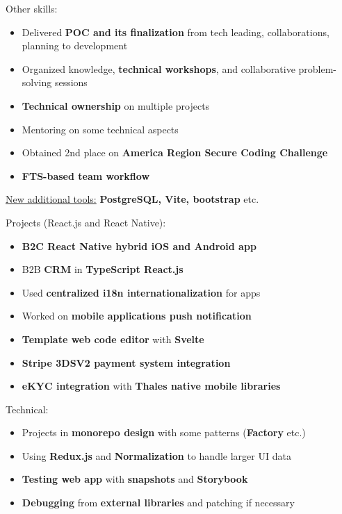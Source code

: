 \documentclass[10pt,a4paper,ragged2e,withhyper]{altacv}
\begin{document}
\medskip
Other skills:
\begin{itemize}
  \item Delivered \textbf{POC and its finalization} from tech leading, collaborations, planning to development
  \item Organized knowledge, \textbf{technical workshops}, and collaborative problem-solving sessions
  \item \textbf{Technical ownership} on multiple projects
  \item Mentoring on some technical aspects
  \item Obtained 2nd place on \textbf{America Region Secure Coding Challenge}
  \item \textbf{FTS-based team workflow}
\end{itemize}
\begin{itshape}
  \underline{New additional tools:}
  \small{\textbf{PostgreSQL, Vite, bootstrap} etc.}
\end{itshape}

\divider

\vspace{-.5\baselineskip}
\begin{minipage}[t]{0.45\textwidth}
  \vspace{0pt}
  Projects (React.js and React Native):
  \begin{itemize}
    \item \textbf{B2C React Native hybrid iOS and Android app}
    \item B2B \textbf{CRM} in \textbf{TypeScript React.js}
    \item Used \textbf{centralized i18n internationalization} for apps
    \item Worked on \textbf{mobile applications push notification}
    \item \textbf{Template web code editor} with \textbf{Svelte}
    \item \textbf{Stripe 3DSV2 payment system integration}
    \item \textbf{eKYC integration} with \textbf{Thales native mobile libraries}
  \end{itemize}
\end{minipage}
\hfill
\begin{minipage}[t]{0.45\textwidth}
  \vspace{0pt}
  Technical:
  \begin{itemize}
    \item Projects in \textbf{monorepo design} with some patterns (\textbf{Factory} etc.)
    \item Using \textbf{Redux.js} and \textbf{Normalization} to handle larger UI data
    \item \textbf{Testing web app} with \textbf{snapshots} and \textbf{Storybook}
    \item \textbf{Debugging} from \textbf{external libraries} and patching if necessary
  \end{itemize}
\end{minipage}
\end{document}
